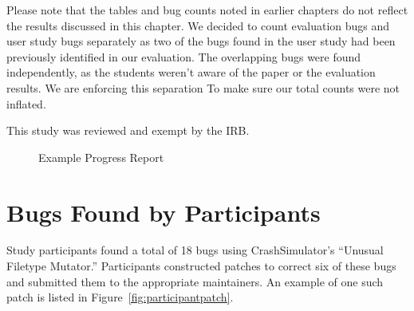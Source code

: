 Please note that the tables and bug counts noted in earlier
chapters do not reflect the results discussed in this chapter. We decided to count evaluation bugs and user study bugs separately as two of the bugs found in the user study
had been previously identified
in our evaluation.
The overlapping bugs were found independently,
as the students weren't aware of the paper or the evaluation results.
We are enforcing this separation To make sure our total counts were not inflated.


This study was reviewed and exempt by the IRB.

\begin{figure}[btp]
\centering
{}
\caption[Example Progress Report]{Example Progress Report}
\label{fig:examplereport}
\end{figure}
\restoregeometry

\section{Bugs Found by Participants}
\label{subsec:bugs-by-participants}
Study participants found a total of 18 bugs using CrashSimulator's
``Unusual Filetype Mutator.''
Participants constructed patches to correct six of these bugs and submitted
them to the appropriate maintainers.
An example of one such patch is listed in Figure~\ref{fig:participantpatch}.

